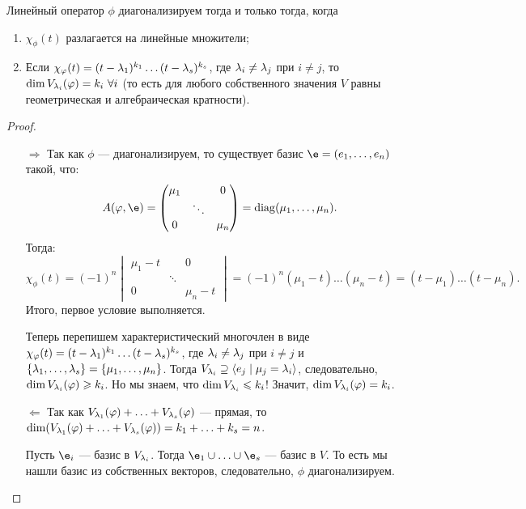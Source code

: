 \begin{Theorem}
Линейный оператор $\phi$ диагонализируем тогда и только тогда, когда 
\begin{enumerate}
\item $\chi_\phi(t)$ разлагается на линейные множители;
\item Если $\chi_\varphi(t) = (t - \lambda_1)^{k_1}\dots(t - \lambda_s)^{k_s}$, где $\lambda_i \neq \lambda_j$ при $i \neq j$, то $\dim V_{\lambda_i}(\varphi) = k_i \ \forall i$ (то есть для любого собственного значения $V$ равны геометрическая и алгебраическая кратности).
\end{enumerate}
\end{Theorem}

\begin{proof}\
\begin{itemize}
\item[$\Rightarrow$] Так как $\phi$ --- диагонализируем, то существует базис $\e = (e_1, \ldots, e_n)$ такой, что:
\begin{gather*}
A(\phi, \e) = 
\begin{pmatrix*}
\mu_1 & & 0 \\
& \ddots & \\
0 & & \mu_n
\end{pmatrix*} = \diag(\mu_1, \ldots, \mu_n).
\end{gather*}
Тогда:
$$
\chi_\phi(t) = (-1)^n 
\begin{vmatrix}
\mu_1-t & & 0 \\
& \ddots & \\
0 & & \mu_n-t
\end{vmatrix} = (-1)^n(\mu_1 - t)\ldots(\mu_n - t) = (t - \mu_1)\ldots(t-\mu_n).
$$
Итого, первое условие выполняется.

Теперь перепишем характеристический многочлен в виде $\chi_\varphi(t) = (t - \lambda_1)^{k_1}\dots(t - \lambda_s)^{k_s}$, где $\lambda_i \neq \lambda_j$ при $i \neq j$ и $\{ \lambda_1, \ldots, \lambda_s \} = \{\mu_1, \ldots, \mu_n \}$. Тогда $V_{\lambda_i} \supseteq \langle e_j \mid \mu_j = \lambda_i \rangle$, следовательно, $\dim V_{\lambda_i}(\varphi) \geqslant k_i$. Но мы знаем, что $\dim V_{\lambda_i} \leqslant k_i$! Значит, $\dim V_{\lambda_i}(\varphi) = k_i$.

\item[$\Leftarrow$] Так как $V_{\lambda_1}(\varphi) + \ldots + V_{\lambda_s}(\varphi)$ --- прямая, то $\dim (V_{\lambda_1}(\varphi) + \ldots + V_{\lambda_s}(\varphi)) = k_1 + \ldots + k_s = n$.

Пусть $\e_i$ --- базис в $V_{\lambda_i}$. Тогда $\e_1 \cup \ldots \cup \e_s$ --- базис в $V$. То есть мы нашли базис из собственных векторов, следовательно, $\phi$ диагонализируем.
\end{itemize}
\end{proof}

